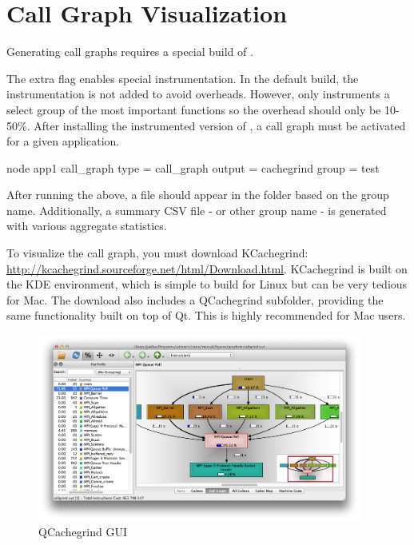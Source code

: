

\section{Call Graph Visualization}
\label{sec:tutorials:callgraph}
Generating call graphs requires a special build of \sstmacro.

The extra flag enables special instrumentation.
In the default build, the instrumentation is not added to avoid overheads.
However, \sstmacro only instruments a select group of the most important functions so the overhead should only be 10-50\%.
After installing the instrumented version of \sstmacro, a call graph must be activated for a given application.

\begin{ViFile}
node {
  app1 {
    call_graph {
      type = call_graph
      output = cachegrind
      group = test
    }
  }
}
\end{ViFile}
After running the above, a  file should appear in the folder based on the group name.
Additionally, a summary CSV file -  or other group name - is generated with various aggregate statistics.

To visualize the call graph, you must download KCachegrind: \url{http://kcachegrind.sourceforge.net/html/Download.html}.
KCachegrind is built on the KDE environment, which is simple to build for Linux but can be very tedious for Mac.
The download also includes a QCachegrind subfolder, providing the same functionality built on top of Qt.  
This is highly recommended for Mac users.

\begin{figure}[h]
\centering
\includegraphics[width=0.95\textwidth]{figures/graphviz/gui.png}
\caption{QCachegrind GUI}
\label{fig:qcgui}
\end{figure}

